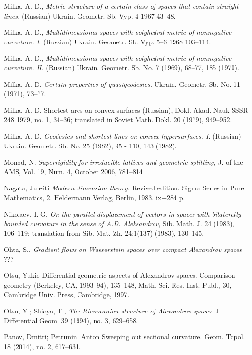 \begin{thebibliography}{52}
Milka, A. D., \textit{Metric structure of a certain class of spaces that contain straight lines.} (Russian) Ukrain. Geometr. Sb. Vyp.  4  1967 43--48.

Milka, A. D., \textit{Multidimensional spaces with polyhedral metric of nonnegative curvature. I.}  (Russian)  Ukrain. Geometr. Sb. Vyp.  5--6 
1968 103--114. 

Milka, A. D., \textit{Multidimensional spaces with polyhedral metric of nonnegative curvature. II.}  (Russian)  Ukrain. Geometr. Sb. No. 7
(1969), 68--77, 185 (1970).

Milka, A. D. \textit{Certain properties of quasigeodesics.} 
Ukrain. Geometr. Sb. No. 11 (1971), 73--77.

 {Milka, A. D.} {Shortest arcs on convex surfaces} (Russian),  {Dokl. Akad.
Nauk SSSR}  {248}  {1979}, {no. 1}, {34--36};  translated in  Soviet Math. Dokl. 20 (1979), 949--952.

 Milka, A. D.  \textit{Geodesics and shortest lines on convex hypersurfaces.  I.}  (Russian)   Ukrain. Geometr. Sb. No. 25
(1982), 95 - 110, 143 (1982).

 Monod, N. \textit{Superrigidity for irreducible lattices and geometric splitting,} J. of the AMS,
Vol. 19, Num. 4, October 2006, 781--814

 Nagata, Jun-iti \textit{Modern dimension theory.} Revised edition. Sigma Series in Pure Mathematics, 2. Heldermann Verlag, Berlin, 1983. ix+284 p.

 Nikolaev, I. G. \textit{On the parallel displacement of vectors in spaces with
bilaterally bounded curvature in the sense of A.D. Aleksandrov}, Sib. Math.
J. 24 (1983), 106--119; translation from Sib. Mat. Zh. 24:1(137) (1983), 130--145.


 Ohta, S., \textit{Gradient flows on Wasserstein spaces
over compact Alexandrov spaces} ???

 Otsu, Yukio Differential geometric aspects of Alexandrov spaces.  Comparison
geometry (Berkeley, CA, 1993--94),  135--148, Math. Sci. Res. Inst. Publ., 30,
Cambridge Univ. Press, Cambridge, 1997.

 Otsu, Y.; Shioya, T., \textit{The Riemannian structure of Alexandrov spaces.}  J. Differential Geom.  39  (1994),  no. 3, 629--658.

Panov, Dmitri; Petrunin, Anton
Sweeping out sectional curvature. 
Geom. Topol. 18 (2014), no. 2, 617--631. 


\end{thebibliography}
